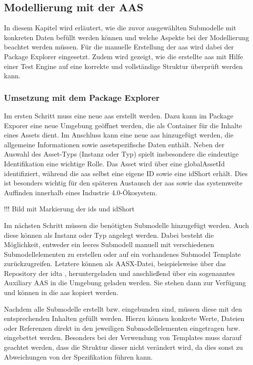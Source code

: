 \subsection{Modellierung mit der AAS}
In diesem Kapitel wird erläutert, wie die zuvor ausgewählten Submodelle mit konkreten Daten befüllt werden können und welche Aspekte bei der Modellierung beachtet werden müssen.
Für die manuelle Erstellung der \acs{aas} wird dabei der Package Explorer eingesetzt.
Zudem wird gezeigt, wie die erstellte \acs{aas} mit Hilfe einer Test Engine auf eine korrekte und vollständige Struktur überprüft werden kann. 
\subsubsection{Umsetzung mit dem Package Explorer}
Im ersten Schritt muss eine neue \acs{aas} erstellt werden.
Dazu kann im Package Exporer eine neue Umgebung geöffnet werden, die als Container für die Inhalte eines Assets dient.
Im Anschluss kann eine neue \acs{aas} hinzugefügt werden, die allgemeine Informationen sowie assetspezifische Daten enthält.
Neben der Auswahl des Asset-Typs (Instanz oder Typ) spielt insbesondere die eindeutige Identifikation eine wichtige Rolle.
Das Asset wird über eine globalAssetId identifiziert, während die \acs{aas} selbst eine eigene ID sowie eine idShort erhält.
Dies ist besonders wichtig für den späteren Austausch der \acs{aas} sowie das systemweite Auffinden innerhalb eines Industrie 4.0-Ökosystem.

!!! Bild mit Markierung der ids und idShort

Im nächsten Schritt müssen die benötigten Submodelle hinzugefügt werden. 
Auch diese können als Instanz oder Typ angelegt werden.
Dabei besteht die Möglichkeit, entweder ein leeres Submodell manuell mit verschiedenen Submodellelementen zu erstellen oder auf ein vorhandenes Submodel Template zurückzugreifen.
Letztere können als AASX-Datei, beispielsweise über das Repository der \acs{idta} \cite{idtaTemplates}, heruntergeladen und anschließend über ein sogenanntes Auxiliary AAS in die Umgebung geladen werden.
Sie stehen dann zur Verfügung und können in die \acs{aas} kopiert werden.

Nachdem alle Submodelle erstellt bzw. eingebunden sind, müssen diese mit den entsprechenden Inhalten gefüllt werden.
Hierzu können konkrete Werte, Dateien oder Referenzen direkt in den jeweiligen Submodellelementen eingetragen bzw. eingebettet werden.
Besonders bei der Verwendung von Templates muss darauf geachtet werden, dass die Struktur dieser nicht verändert wird, da dies sonst zu Abweichungen von der Spezifikation führen kann.


